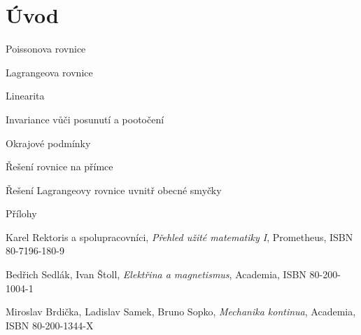 \documentclass{book}
\begin{document}
\chapter{Úvod}









Poissonova rovnice

Lagrangeova rovnice

Linearita

Invariance vůči posunutí a pootočení

Okrajové podmínky

Řešení rovnice na přímce

Řešení Lagrangeovy rovnice uvnitř obecné smyčky

Přílohy

\begin{thebibliography}{9}

Karel Rektoris a spolupracovníci,
\textit{Přehled užité matematiky I},
Prometheus,
ISBN 80-7196-180-9

Bedřich Sedlák, Ivan Štoll,
\textit{Elektřina a magnetismus},
Academia,
ISBN 80-200-1004-1

Miroslav Brdička, Ladislav Samek, Bruno Sopko,
\textit{Mechanika kontinua},
Academia,
ISBN 80-200-1344-X


\end{thebibliography}
\end{document}

